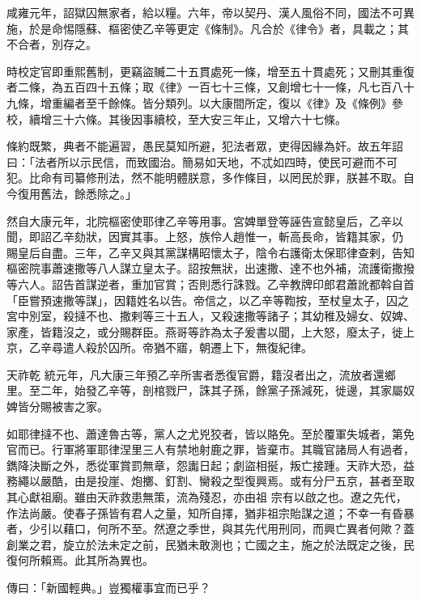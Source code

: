 \begin{pinyinscope}
 咸雍元年，詔獄囚無家者，給以糧。六年，帝以契丹、漢人風俗不同，國法不可異施，於是命惕隱蘇、樞密使乙辛等更定《條制》。凡合於《律令》者，具載之；其不合者，別存之。



 時校定官即重熙舊制，更竊盜贓二十五貫處死一條，增至五十貫處死；又刪其重復者二條，為五百四十五條；取《律》一百七十三條，又創增七十一條，凡七百八十
 九條，增重編者至千餘條。皆分類列。以大康間所定，復以《律》及《條例》參校，續增三十六條。其後因事續校，至大安三年止，又增六十七條。



 條約既繁，典者不能遍習，愚民莫知所避，犯法者眾，吏得因緣為奸。故五年詔曰：「法者所以示民信，而致國治。簡易如天地，不忒如四時，使民可避而不可犯。比命有司纂修刑法，然不能明體朕意，多作條目，以罔民於罪，朕甚不取。自今復用舊法，餘悉除之。」



 然自大康元年，北院樞密使耶律乙辛等用事。宮婢單登等誣告宣懿皇后，乙辛以聞，即詔乙辛劾狀，因實其事。上怒，族伶人趙惟一，斬高長命，皆籍其家，仍
 賜皇后自盡。三年，乙辛又與其黨謀構昭懷太子，陰令右護衛太保耶律查剌，告知樞密院事蕭速撒等八人謀立皇太子。詔按無狀，出速撒、達不也外補，流護衛撒撥等六人。詔告首謀逆者，重加官賞；否則悉行誅戮。乙辛教牌印郎君蕭訛都斡自首「臣嘗預速撒等謀」，因籍姓名以告。帝信之，以乙辛等鞫按，至杖皇太子，囚之宮中別室，殺撻不也、撒剌等三十五人，又殺速撒等諸子；其幼稚及婦女、奴婢、家產，皆籍沒之，或分賜群臣。燕哥等詐為太子爰書以聞，上大怒，廢太子，徙上京，乙辛尋遣人殺於囚所。帝猶不寤，朝遷上下，無復紀律。



 天祚乾
 統元年，凡大康三年預乙辛所害者悉復官爵，籍沒者出之，流放者還鄉里。至二年，始發乙辛等，剖棺戮尸，誅其子孫，餘黨子孫減死，徙邊，其家屬奴婢皆分賜被害之家。



 如耶律撻不也、蕭達魯古等，黨人之尤兇狡者，皆以賂免。至於覆軍失城者，第免官而已。行軍將軍耶律涅里三人有禁地射鹿之罪，皆棄市。其職官諸局人有過者，鐫降決斷之外，悉從軍賞罰無章，怨讟日起；劇盜相挻，叛亡接踵。天祚大恐，益務繩以嚴酷，由是投崖、炮擲、釘割、臠殺之型復興焉。或有分尸五京，甚者至取其心獻祖廟。雖由天祚救患無策，流為殘忍，亦由祖
 宗有以啟之也。遼之先代，作法尚嚴。使春子孫皆有君人之量，知所自擇，猶非祖宗貽謀之道；不幸一有昏暴者，少引以藉口，何所不至。然遼之季世，與其先代用刑同，而興亡異者何歟？蓋創業之君，旋立於法未定之前，民猶未敢測也；亡國之主，施之於法既定之後，民復何所賴焉。此其所為異也。



 傳曰：「新國輕典。」豈獨權事宜而已乎？




\end{pinyinscope}

